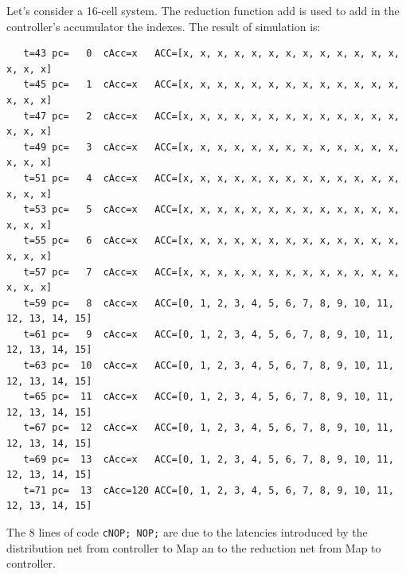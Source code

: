\begin{exemplu}
Let's consider a 16-cell system. The reduction function add is used to add in the controller's accumulator the indexes.
{\em 
{}
}
The result of simulation is:
{\small
\begin{verbatim}
   t=43 pc=   0  cAcc=x   ACC=[x, x, x, x, x, x, x, x, x, x, x, x, x, x, x, x] 
   t=45 pc=   1  cAcc=x   ACC=[x, x, x, x, x, x, x, x, x, x, x, x, x, x, x, x] 
   t=47 pc=   2  cAcc=x   ACC=[x, x, x, x, x, x, x, x, x, x, x, x, x, x, x, x] 
   t=49 pc=   3  cAcc=x   ACC=[x, x, x, x, x, x, x, x, x, x, x, x, x, x, x, x] 
   t=51 pc=   4  cAcc=x   ACC=[x, x, x, x, x, x, x, x, x, x, x, x, x, x, x, x] 
   t=53 pc=   5  cAcc=x   ACC=[x, x, x, x, x, x, x, x, x, x, x, x, x, x, x, x] 
   t=55 pc=   6  cAcc=x   ACC=[x, x, x, x, x, x, x, x, x, x, x, x, x, x, x, x] 
   t=57 pc=   7  cAcc=x   ACC=[x, x, x, x, x, x, x, x, x, x, x, x, x, x, x, x] 
   t=59 pc=   8  cAcc=x   ACC=[0, 1, 2, 3, 4, 5, 6, 7, 8, 9, 10, 11, 12, 13, 14, 15] 
   t=61 pc=   9  cAcc=x   ACC=[0, 1, 2, 3, 4, 5, 6, 7, 8, 9, 10, 11, 12, 13, 14, 15] 
   t=63 pc=  10  cAcc=x   ACC=[0, 1, 2, 3, 4, 5, 6, 7, 8, 9, 10, 11, 12, 13, 14, 15] 
   t=65 pc=  11  cAcc=x   ACC=[0, 1, 2, 3, 4, 5, 6, 7, 8, 9, 10, 11, 12, 13, 14, 15] 
   t=67 pc=  12  cAcc=x   ACC=[0, 1, 2, 3, 4, 5, 6, 7, 8, 9, 10, 11, 12, 13, 14, 15] 
   t=69 pc=  13  cAcc=x   ACC=[0, 1, 2, 3, 4, 5, 6, 7, 8, 9, 10, 11, 12, 13, 14, 15] 
   t=71 pc=  13  cAcc=120 ACC=[0, 1, 2, 3, 4, 5, 6, 7, 8, 9, 10, 11, 12, 13, 14, 15]
\end{verbatim}
}
The 8 lines of code {\tt cNOP; NOP;} are due to the latencies introduced by the distribution net from controller to Map an to the reduction net from Map to controller.


\end{exemplu}
